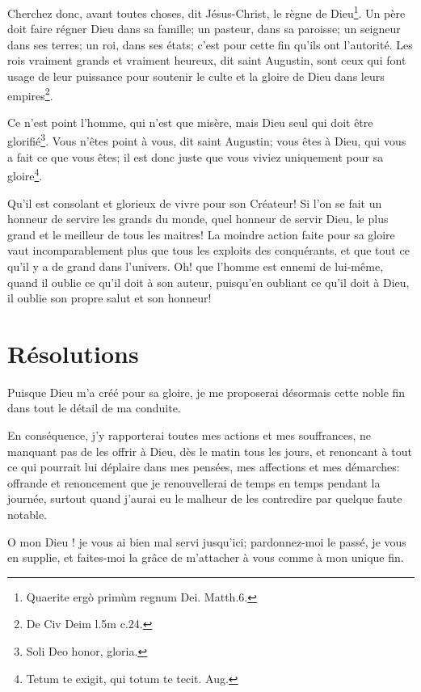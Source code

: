 \documentclass[instructions.tex]{subfiles}
\begin{document}
Cherchez donc, avant toutes choses, dit Jésus-Christ, le règne de Dieu\footnote{Quaerite ergò primùm regnum Dei. Matth.6.}. Un père doit faire régner Dieu dans sa famille; un pasteur, dans sa paroisse; un seigneur dans ses terres; un roi, dans ses états; c'est pour cette fin qu'ils ont l'autorité. Les rois vraiment grands et vraiment heureux, dit saint Augustin, sont ceux qui font usage de leur puissance pour soutenir le culte et la gloire de Dieu dans leurs empires\footnote{De Civ Deim l.5m c.24.}. 

Ce n'est point l'homme, qui n'est que misère, mais Dieu seul qui doit être glorifié\footnote{Soli Deo honor, gloria.}. Vous n'êtes point à vous, dit saint Augustin; vous êtes à Dieu, qui vous a fait ce que vous êtes; il est donc juste que vous viviez uniquement pour sa gloire\footnote{Tetum te exigit, qui totum te tecit. Aug.}. 

Qu'il est consolant et glorieux de vivre pour son Créateur! Si l'on se fait un honneur de servire les grands du monde, quel honneur de servir Dieu, le plus grand et le meilleur de tous les maitres! La moindre action faite pour sa gloire vaut incomparablement plus que tous les exploits des conquérants, et que tout ce qu'il y a de grand dans l'univers. Oh! que l'homme est ennemi de lui-même, quand il oublie ce qu'il doit à son auteur, puisqu'en oubliant ce qu'il doit à Dieu, il oublie son propre salut et son honneur!

\section{Résolutions}

\primo Puisque Dieu m'a créé pour sa gloire, je me proposerai désormais cette noble fin dans tout le détail de ma conduite. 

\secundo En conséquence, j'y rapporterai toutes mes actions et mes souffrances, ne manquant pas de les offrir à Dieu, dès le matin tous les jours, et renoncant à tout ce qui pourrait lui déplaire dans mes pensées, mes affections et mes démarches: offrande et renoncement que je renouvellerai de temps en temps pendant la journée, surtout quand j'aurai eu le malheur de les contredire par quelque faute notable. 

O mon Dieu ! je vous ai bien mal servi jusqu'ici; pardonnez-moi le passé, je vous en supplie, et faites-moi la grâce de m'attacher à vous comme à mon unique fin.
\end{document}
